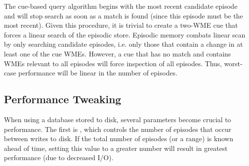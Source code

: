 The cue-based query algorithm begins with the most recent candidate episode and will stop search as soon as a match is found (since this episode must be the most recent).  Given this procedure, it is trivial to create a two-WME cue that forces a linear search of the episodic store. Episodic memory combats linear scan by only searching candidate episodes, i.e. only those that contain a change in at least one of the cue WMEs.  However, a cue that has no match and contains WMEs relevant to all episodes will force inspection of all episodes.  Thus, worst-case performance will be linear in the number of episodes. 

\subsection{Performance Tweaking}
When using a database stored to disk, several parameters become crucial to performance.  The first is , which controls the number of episodes that occur between writes to disk.  If the total number of episodes (or a range) is known ahead of time, setting this value to a greater number will result in greatest performance (due to decreased I/O).

